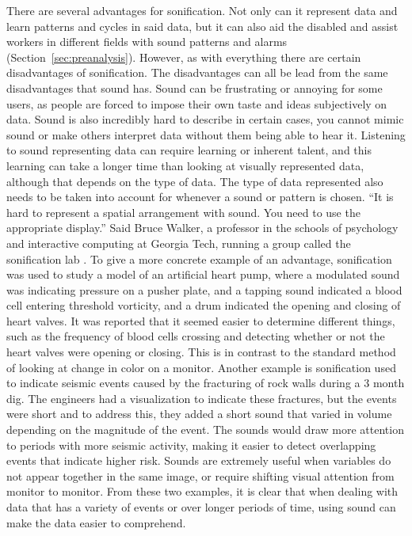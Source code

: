 There are several advantages for sonification. Not only can it represent data and learn patterns and cycles in said data, but it can also aid the disabled and assist workers in different fields with sound patterns and alarms (Section~\ref{sec:preanalysis}).
However, as with everything there are certain disadvantages of sonification. 
The disadvantages can all be lead from the same disadvantages that sound has. Sound can be frustrating or annoying for some users, as people are forced to impose their own taste and ideas subjectively on data. 
Sound is also incredibly hard to describe in certain cases, you cannot mimic sound or make others interpret data without them being able to hear it. 
Listening to sound representing data can require learning or inherent talent, and this learning can take a longer time than looking at visually represented data, although that depends on the type of data. 
The type of data represented also needs to be taken into account for whenever a sound or pattern is chosen. 
\enquote{It is hard to represent a spatial arrangement with sound. You need to use the appropriate display.} Said Bruce Walker, a professor in the schools of psychology and interactive computing at Georgia Tech, running a group called the sonification lab \cite[Sec. Opportunities and pitfalls]{Feder2012}.
To give a more concrete example of an advantage, sonification was used to study a model of an artificial heart pump, where a modulated sound was indicating pressure on a pusher plate, and a tapping sound indicated a blood cell entering threshold vorticity, and a drum indicated the opening and closing of heart valves. 
It was reported that it seemed easier to determine different things, such as the frequency of blood cells crossing and detecting whether or not the heart valves were opening or closing. 
This is in contrast to the standard method of looking at change in color on a monitor. 
Another example is sonification used to indicate seismic events caused by the fracturing of rock walls during a 3 month dig. 
The engineers had a visualization to indicate these fractures, but the events were short and to address this, they added a short sound that varied in volume depending on the magnitude of the event. 
The sounds would draw more attention to periods with more seismic activity, making it easier to detect overlapping events that indicate higher risk. 
Sounds are extremely useful when variables do not appear together in the same image, or require shifting visual attention from monitor to monitor. 
From these two examples, it is clear that when dealing with data that has a variety of events or over longer periods of time, using sound can make the data easier to comprehend.


